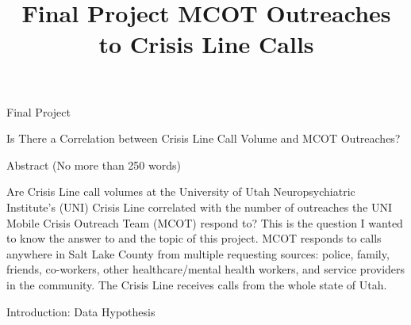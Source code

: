 \documentclass[11pt]{article}
\title{Final Project MCOT Outreaches to Crisis Line Calls}
\begin{document}
    
    
    \maketitle
    
    

    
    Final Project

    Is There a Correlation between Crisis Line Call Volume and MCOT
Outreaches?

    Abstract (No more than 250 words)

    Are Crisis Line call volumes at the University of Utah Neuropsychiatric
Institute's (UNI) Crisis Line correlated with the number of outreaches
the UNI Mobile Crisis Outreach Team (MCOT) respond to? This is the
question I wanted to know the answer to and the topic of this project.
MCOT responds to calls anywhere in Salt Lake County from multiple
requesting sources: police, family, friends, co-workers, other
healthcare/mental health workers, and service providers in the
community. The Crisis Line receives calls from the whole state of Utah.

    Introduction: Data Hypothesis
\end{document}
